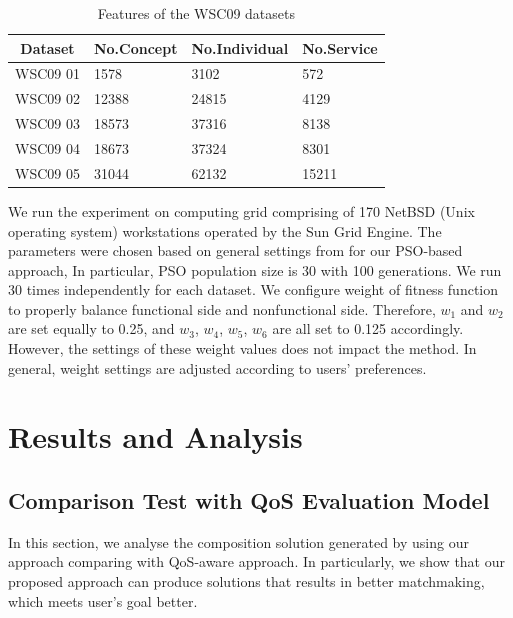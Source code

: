 \documentclass{IEEEtran}
\begin{document}
\begin{table}[]
\centering
\caption{Features of the WSC09 datasets}
\label{wsc09datasetTable}
\begin{tabular}{l|l|l|l}
\hline
\multicolumn{1}{c|}{Dataset} & No.Concept & No.Individual & No.Service \\ \hline
WSC09 01                     & 1578       &3102           &572      \\ \hline
WSC09 02                     & 12388      &24815          &4129      \\ \hline
WSC09 03                     & 18573      &37316          &8138      \\ \hline
WSC09 04                     & 18673      &37324          &8301      \\ \hline
WSC09 05                     & 31044      &62132          &15211    \\ \hline
\end{tabular}
\end{table}

We run the experiment on computing grid comprising of 170 NetBSD (Unix operating system) workstations operated by the Sun Grid Engine. The parameters were chosen based on general settings from \cite{shi2001particle} for our PSO-based approach, In particular, PSO population size is 30 with 100 generations. We run 30 times independently for each dataset. We configure weight of fitness function to properly balance functional side and nonfunctional side. Therefore, $w_{1}$ and $w_{2}$ are set equally to 0.25, and $w_{3}$, $w_{4}$, $w_{5}$, $w_{6}$ are all set to 0.125 accordingly. However, the settings of these weight values does not impact the method. In general, weight settings are adjusted according to users' preferences.


\section{Results and Analysis}\label{results_analysis}
\subsection{Comparison Test with QoS Evaluation Model}\label{comparisonTest}
In this section, we analyse the composition solution generated by using our approach comparing with QoS-aware approach. In particularly, we show that our proposed approach can produce solutions that results in better matchmaking, which meets user's goal better.
 
\end{document}
